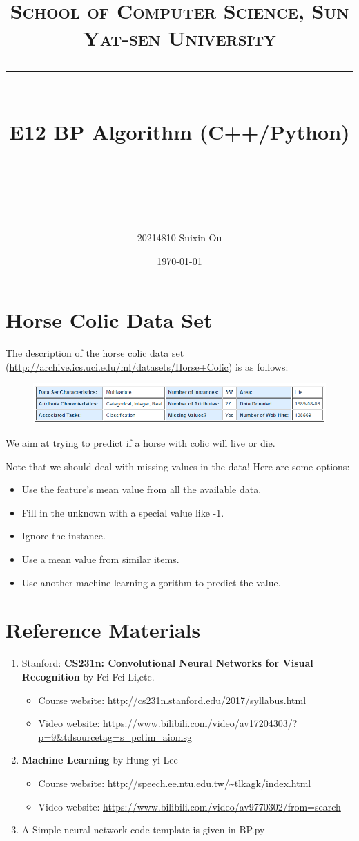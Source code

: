 \documentclass[a4paper, 11pt]{article}
\title{	
\normalfont \normalsize
\textsc{School of Computer Science, Sun Yat-sen University} \\ [25pt] %
\rule{\textwidth}{0.5pt} \\[0.4cm] %
\huge  E12 BP Algorithm (C++/Python)\\ %
\rule{\textwidth}{2pt} \\[0.5cm] %
\author{20214810 Suixin Ou}
\date{\normalsize\today}
}
\begin{document}
\maketitle
\tableofcontents
\newpage
\section{Horse Colic Data Set}
The description of the horse colic data set (\url{http://archive.ics.uci.edu/ml/datasets/Horse+Colic}) is as follows:
\begin{figure}[ht]
\centering
\includegraphics[width=15cm]{horse}
\end{figure}

We aim at trying to predict if a horse with colic will live or die.

Note that we should deal with missing values in the data! Here are some options:
\begin{itemize}
	\item Use the feature’s mean value from all the available data.
	\item Fill in the unknown with a special value like -1.
	\item Ignore the instance.
	\item Use a mean value from similar items.
	\item Use another machine learning algorithm to predict the value.
\end{itemize}

\section{Reference Materials}
\begin{enumerate}
	\item Stanford: \textbf{CS231n: Convolutional Neural Networks for Visual Recognition} by Fei-Fei Li,etc.
	\begin{itemize}
		\item Course website: \url{http://cs231n.stanford.edu/2017/syllabus.html}
		\item Video website: \url{https://www.bilibili.com/video/av17204303/?p=9&tdsourcetag=s_pctim_aiomsg}
	\end{itemize}
	
	\item \textbf{Machine Learning} by Hung-yi Lee
	\begin{itemize}
		\item Course website: \url{http://speech.ee.ntu.edu.tw/~tlkagk/index.html}
		\item Video website: \url{https://www.bilibili.com/video/av9770302/from=search}
	\end{itemize}
	\item A Simple neural network code template is given in BP.py
\end{enumerate}
\end{document}
